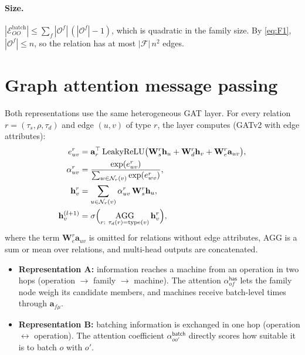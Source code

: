 \documentclass[11pt,a4paper]{article}
\newcommand{\Oset}{\mathcal{O}}
\newcommand{\Fset}{\mathcal{F}}
\newcommand{\Eset}{\mathcal{E}}
\begin{document}
\paragraph{Size.}
$|\Eset_{OO}^{\mathrm{batch}}|\le\sum_f|\Oset^f|\,(|\Oset^f|-1)$, which is
quadratic in the family size. By \eqref{eq:F1}, $|\Oset^f|\le n$, so the relation
has at most $|\Fset|\,n^2$ edges.

\section{Graph attention message passing}
\label{sec:gat}

Both representations use the same heterogeneous GAT layer. For every relation
$r=(\tau_s,\rho,\tau_d)$ and edge $(u,v)$ of type $r$, the layer computes
(GATv2 with edge attributes):
\begin{align}
  e^{r}_{uv} &= \mathbf{a}_r^{\top}\,\mathrm{LeakyReLU}\bigl(\mathbf{W}^{r}_{s}\mathbf{h}_u+\mathbf{W}^{r}_{d}\mathbf{h}_v+\mathbf{W}^{r}_{e}\mathbf{a}_{uv}\bigr), \label{eq:gat1}\\
  \alpha^{r}_{uv} &= \frac{\exp(e^{r}_{uv})}{\sum_{w\in\mathcal{N}_r(v)}\exp(e^{r}_{wv})}, \label{eq:gat2}\\
  \mathbf{h}^{r}_{v} &= \sum_{u\in\mathcal{N}_r(v)}\alpha^{r}_{uv}\,\mathbf{W}^{r}_{s}\mathbf{h}_u, \label{eq:gat3}\\
  \mathbf{h}^{(l+1)}_{v} &= \sigma\Bigl(\operatorname*{AGG}_{r:\ \tau_d(r)=\operatorname{type}(v)}\mathbf{h}^{r}_{v}\Bigr), \label{eq:gat4}
\end{align}
where the term $\mathbf{W}^{r}_{e}\mathbf{a}_{uv}$ is omitted for relations
without edge attributes, AGG is a sum or mean over relations, and multi-head
outputs are concatenated.

\begin{itemize}
  \item \textbf{Representation A:} information reaches a machine from an operation in two hops (operation $\to$ family $\to$ machine). The attention $\alpha^{\textsf{has}}_{of}$ lets the family node weigh its candidate members, and machines receive batch-level times through $\mathbf{a}_{f\mu}$.
  \item \textbf{Representation B:} batching information is exchanged in one hop (operation $\leftrightarrow$ operation). The attention coefficient $\alpha^{\textsf{batch}}_{oo'}$ directly scores how suitable it is to batch $o$ with $o'$.
\end{itemize}
\end{document}
